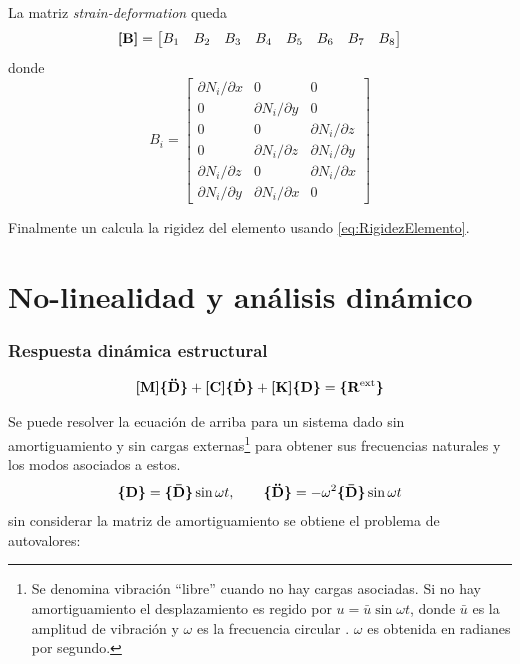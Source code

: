 La matriz \textit{strain-deformation} queda
\[
\boldsymbol{[}\mathbf{B} \boldsymbol{]} = \begin{bmatrix}
B_1 &B_2 &B_3 &B_4 &B_5 &B_6 &B_7 &B_8
\end{bmatrix}
\]
donde
\begin{equation}
B_{i}=\left[\begin{array}{ccc}{\partial N_{i} / \partial x} & {0} & {0} \\ {0} & {\partial N_{i} / \partial y} & {0} \\ {0} & {0} & {\partial N_{i} / \partial z} \\ {0} & {\partial N_{i} / \partial z} & {\partial N_{i} / \partial y} \\ {\partial N_{i} / \partial z} & {0} & {\partial N_{i} / \partial x} \\ {\partial N_{i} / \partial y} & {\partial N_{i} / \partial x} & {0}\end{array}\right]
\end{equation}

Finalmente un calcula la rigidez del elemento usando \eqref{eq:RigidezElemento}.






\part{No-linealidad y análisis dinámico}

\section{Respuesta dinámica estructural}

\begin{equation} \label{eq:ecuacionDinamicaGeneral}
	\boldsymbol{[}\mathbf{M} \boldsymbol{]}\boldsymbol{\{ }\mathbf{\boldsymbol{\ddot{\mathrm{D}}}} \boldsymbol{\}} + \boldsymbol{[}\mathbf{C} \boldsymbol{]}\boldsymbol{\{ }\mathbf{\boldsymbol{\dot{\mathrm{D}}}} \boldsymbol{\}}+\boldsymbol{[}\mathbf{K} \boldsymbol{]} \boldsymbol{\{ }\mathbf{D} \boldsymbol{\}} =\boldsymbol{\{ }\mathbf{R^{\mathrm{ext}}} \boldsymbol{\}}
\end{equation}

Se puede resolver la ecuación de arriba para un sistema dado sin amortiguamiento y sin cargas externas\footnote{Se denomina vibración ``libre'' cuando no hay cargas asociadas. Si no hay amortiguamiento el desplazamiento es regido por $u= \bar{u}\sin \omega t$, donde $\bar{u}$ es la amplitud de vibración y $\omega$ es la frecuencia circular \cite{cook2007concepts}. $\omega$ es obtenida en radianes por segundo.} para obtener sus frecuencias naturales y los modos asociados a estos.
\[
\boldsymbol{\{ }\mathbf{D} \boldsymbol{\}} = \boldsymbol{\{ }\mathbf{\boldsymbol{\bar{\mathrm D}}} \boldsymbol{\}}\sin \omega t, \qquad \boldsymbol{\{ }\mathbf{\boldsymbol{\ddot{\mathrm{D}}}} \boldsymbol{\}}= -\omega^2 \boldsymbol{\{ }\mathbf{\boldsymbol{\bar{\mathrm D}}} \boldsymbol{\}} \sin \omega t
\]
sin considerar la matriz de amortiguamiento se obtiene el problema de autovalores:

